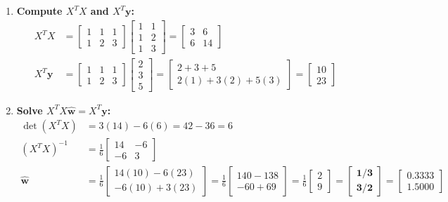 \begin{enumerate}
    \item \textbf{Compute $X^T X$ and $X^T \mathbf{y}$:}
    \begin{align*}
    X^T X &= \begin{bmatrix} 1 & 1 & 1 \\ 1 & 2 & 3 \end{bmatrix} \begin{bmatrix} 1 & 1 \\ 1 & 2 \\ 1 & 3 \end{bmatrix} = \begin{bmatrix} 3 & 6 \\ 6 & 14 \end{bmatrix} \\
    X^T \mathbf{y} &= \begin{bmatrix} 1 & 1 & 1 \\ 1 & 2 & 3 \end{bmatrix} \begin{bmatrix} 2 \\ 3 \\ 5 \end{bmatrix} = \begin{bmatrix} 2 + 3 + 5 \\ 2(1) + 3(2) + 5(3) \end{bmatrix} = \begin{bmatrix} 10 \\ 23 \end{bmatrix}
    \end{align*}
    \item \textbf{Solve $X^T X \hat{\mathbf{w}} = X^T \mathbf{y}$:}
    \begin{align*}
    \det(X^T X) &= 3(14) - 6(6) = 42 - 36 = 6 \\
    (X^T X)^{-1} &= \frac{1}{6} \begin{bmatrix} 14 & -6 \\ -6 & 3 \end{bmatrix} \\
    \hat{\mathbf{w}} &= \frac{1}{6} \begin{bmatrix} 14(10) - 6(23) \\ -6(10) + 3(23) \end{bmatrix} = \frac{1}{6} \begin{bmatrix} 140 - 138 \\ -60 + 69 \end{bmatrix} = \frac{1}{6} \begin{bmatrix} 2 \\ 9 \end{bmatrix} = \mathbf{\begin{bmatrix} 1/3 \\ 3/2 \end{bmatrix}} = \mathbf{\begin{bmatrix} 0.3333 \\ 1.5000 \end{bmatrix}}

\end{align*}
\end{enumerate}
